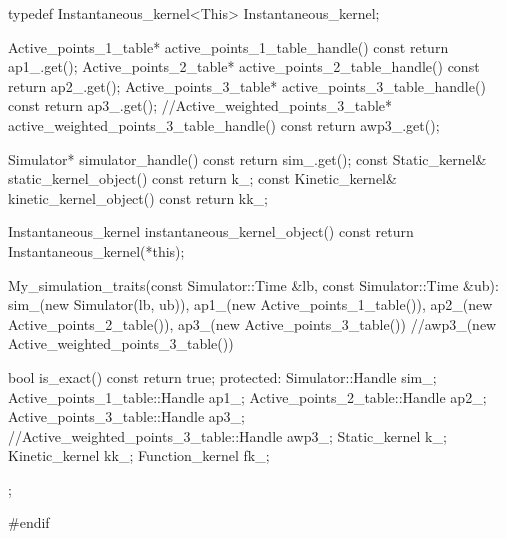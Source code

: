 \begin{ccExampleCode}
{  typedef Instantaneous_kernel<This> Instantaneous_kernel;

  Active_points_1_table* active_points_1_table_handle() const { return ap1_.get();}
  Active_points_2_table* active_points_2_table_handle() const {return ap2_.get();}
  Active_points_3_table* active_points_3_table_handle() const {return ap3_.get();}
  //Active_weighted_points_3_table* active_weighted_points_3_table_handle() const {return awp3_.get();}

  Simulator* simulator_handle() const { return sim_.get();}
  const Static_kernel& static_kernel_object() const {return k_;}
  const Kinetic_kernel& kinetic_kernel_object() const {return kk_;}
 
  Instantaneous_kernel instantaneous_kernel_object() const {
    return Instantaneous_kernel(*this);
  }

  My_simulation_traits(const Simulator::Time &lb,
			  const Simulator::Time &ub): sim_(new Simulator(lb, ub)),
						      ap1_(new Active_points_1_table()),
						      ap2_(new Active_points_2_table()),
						      ap3_(new Active_points_3_table())
						      //awp3_(new Active_weighted_points_3_table())
{}
 
  
  bool is_exact() const {
    return true;
  }
protected:
  Simulator::Handle sim_;
  Active_points_1_table::Handle ap1_;
  Active_points_2_table::Handle ap2_;
  Active_points_3_table::Handle ap3_;
  //Active_weighted_points_3_table::Handle awp3_;
  Static_kernel k_;
  Kinetic_kernel kk_;
  Function_kernel fk_;
};

#endif



\end{ccExampleCode}


